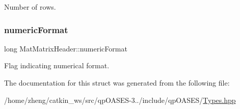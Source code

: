 Number of rows. \mbox{\label{struct_mat_matrix_header_ad1279622648e1eb56a46e2822efd2148}} 
\subsubsection{\texorpdfstring{numeric\+Format}{numericFormat}}
{\footnotesize\ttfamily long Mat\+Matrix\+Header\+::numeric\+Format}

Flag indicating numerical format. 

The documentation for this struct was generated from the following file\+:\begin{DoxyCompactItemize}
\item 
/home/zheng/catkin\+\_\+ws/src/qp\+O\+A\+S\+E\+S-\/3../include/qp\+O\+A\+S\+E\+S/\hyperlink{_types_8hpp}{Types.\+hpp}\end{DoxyCompactItemize}
